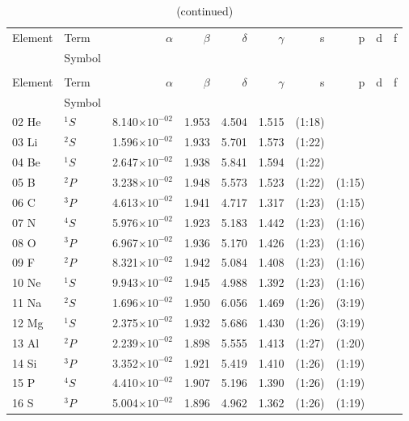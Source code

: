 \documentclass[12pt]{report}
\newcommand{\notetodylan}[1]{\textcolor{red}{#1}} %
\begin{document}
\begin{longtable}{l l r r r r r r r r}
\caption[Basis sets optimized using rwtbs]{Basis sets optimized using rwtbs \notetodylan{make these a multirow}}\label{tab:BStab} \\
\toprule
	Element	&	Term		&	$\alpha$	&	$\beta$	&	$\delta$	&	$\gamma$	&	s	&	p	&	d	&	f	\\
			&	Symbol	&			&			&			&				&		&		&		&		\\
\midrule
\endfirsthead
\caption[]{(continued)}\\
\toprule
	Element	&	Term		&	$\alpha$	&	$\beta$	&	$\delta$	&	$\gamma$	&	s	&	p	&	d	&	f	\\
			&	Symbol	&			&			&			&				&		&		&		&		\\
\midrule
\endhead
02 He & $^{1}S$ & 8.140$\times10^{-02}$ & 1.953 & 4.504 & 1.515 & (1:18) \\
03 Li & $^{2}S$ & 1.596$\times10^{-02}$ & 1.933 & 5.701 & 1.573 & (1:22)  \\
04 Be & $^{1}S$ & 2.647$\times10^{-02}$ & 1.938 & 5.841 & 1.594 & (1:22) \\	
05 B & $^{2}P$ & 3.238$\times10^{-02}$ & 1.948 & 5.573 & 1.523 & (1:22) & (1:15) \\
06 C & $^{3}P$ & 4.613$\times10^{-02}$ & 1.941 & 4.717 & 1.317 & (1:23) & (1:15) \\
07 N & $^{4}S$ & 5.976$\times10^{-02}$ & 1.923 & 5.183 & 1.442 & (1:23) & (1:16)  \\
08 O & $^{3}P$ & 6.967$\times10^{-02}$ & 1.936 & 5.170 & 1.426 & (1:23) & (1:16) \\
09 F & $^{2}P$ & 8.321$\times10^{-02}$ & 1.942 & 5.084 & 1.408 & (1:23) & (1:16) \\
10 Ne & $^{1}S$ & 9.943$\times10^{-02}$ & 1.945 & 4.988 & 1.392 & (1:23) & (1:16) \\
11 Na & $^{2}S$ & 1.696$\times10^{-02}$ & 1.950 & 6.056 & 1.469 & (1:26) & (3:19)  \\
12 Mg & $^{1}S$ & 2.375$\times10^{-02}$ & 1.932 & 5.686 & 1.430 & (1:26) & (3:19) \\
13 Al & $^{2}P$ & 2.239$\times10^{-02}$ & 1.898 & 5.555 & 1.413 & (1:27) & (1:20)  \\
14 Si & $^{3}P$ & 3.352$\times10^{-02}$ & 1.921 & 5.419 & 1.410 & (1:26) & (1:19)  \\
15 P & $^{4}S$ & 4.410$\times10^{-02}$ & 1.907 & 5.196 & 1.390 & (1:26) & (1:19)     \\
16 S & $^{3}P$ & 5.004$\times10^{-02}$ & 1.896 & 4.962 & 1.362 & (1:26) & (1:19)     \\

\end{longtable}
\end{document}
